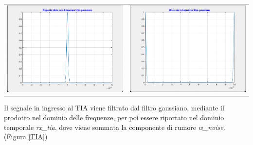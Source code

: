 \documentclass[12pt, a4paper]{article}
\begin{document}
\vspace{5mm}
\begin{center}
\begin{tabular}{c c}
\includegraphics[scale = 0.45]{gaussian.png}
&
\includegraphics[scale = 0.45]{gaussianshifted.png}
\end{tabular}
\end{center}

\vspace{1cm}
Il segnale in ingresso al TIA viene filtrato dal filtro gaussiano, mediante il prodotto nel dominio delle frequenze, per poi essere riportato nel dominio temporale \textit{rx\_tia}, dove viene sommata la componente di rumore \textit{w\_noise}. (Figura \ref{TIA})
\end{document}
